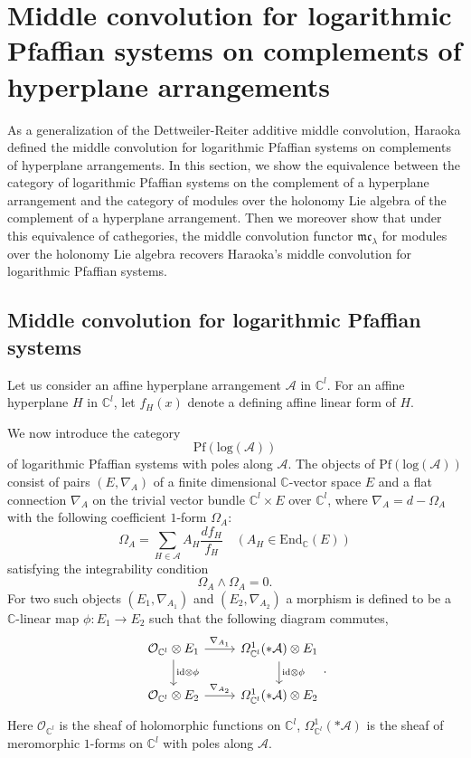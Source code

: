 \documentclass[a4paper,12pt]{article}
\newcommand{\C}{\mathbb{C}}
\theoremstyle{definition}
\theoremstyle{remark}
\begin{document}
\section{Middle convolution for logarithmic Pfaffian systems on complements of hyperplane arrangements}\label{sec:mcPf}
As a generalization of the Dettweiler-Reiter additive middle convolution,
Haraoka \cite{Har1} defined the middle convolution for logarithmic Pfaffian systems on complements of hyperplane arrangements.
In this section, we show the equivalence
between the category of logarithmic Pfaffian systems on the complement of a hyperplane arrangement 
and the category of modules over the holonomy Lie algebra of the complement of a hyperplane arrangement.
Then we moreover show that under this equivalence of cathegories,
the middle convolution functor $\mathfrak{mc}_{\lambda}$ for modules over the holonomy Lie algebra
recovers Haraoka's middle convolution for logarithmic Pfaffian systems.
\subsection{Middle convolution for logarithmic Pfaffian systems}\label{sec:logPf}
Let us consider an affine hyperplane arrangement $\mathcal{A}$ in $\C^{l}$.
For an affine hyperplane $H$ in $\mathbb{C}^{l}$, let $f_{H}(x)$ denote a defining affine linear form of $H$.

We now introduce the category 
\[
	\mathrm{Pf}(\mathrm{log}(\mathcal{A}))
\]
of logarithmic Pfaffian systems with poles along $\mathcal{A}$. 
The objects of $\mathrm{Pf}(\mathrm{log}(\mathcal{A}))$ 
consist of 
pairs $(E,\nabla_{A})$
of a finite dimensional $\mathbb{C}$-vector space $E$ and a flat connection $\nabla_{A}$ on the trivial vector bundle $\mathbb{C}^{l}\times E$ over $\mathbb{C}^{l}$, 
where $\nabla_{A}=d-\Omega_{A}$
with the following coefficient $1$-form $\Omega_{A}$: 
\[
	\Omega_{A}=\sum_{H\in \mathcal{A}}A_{H}\frac{df_{H}}{f_{H}}\quad (A_{H}\in \mathrm{End}_{\mathbb{C}}(E))
\]
satisfying the integrability condition
\[	
	\Omega_{A}\wedge \Omega_{A}=0.
\]
For two such objects $(E_1, \nabla_{A_1})$ and $(E_2, \nabla_{A_2})$
a morphism 
is defined to be a $\mathbb{C}$-linear map $\phi\colon E_{1}\rightarrow E_{2}$
such that the following diagram commutes,
\[
\begin{tikzcd}
\mathcal{O}_{\mathbb{C}^{l}}\otimes E_{1}\arrow[r,"\nabla_{A_{1}}"]\arrow[d,"\mathrm{id}\otimes \phi"]&
\varOmega_{\mathbb{C}^{l}}^{1}(*\mathcal{A})\otimes E_{1}\arrow[d,"\mathrm{id}\otimes \phi"]\\
\mathcal{O}_{\mathbb{C}^{l}}\otimes E_{2}\arrow[r,"\nabla_{A_{2}}"]&
\varOmega_{\mathbb{C}^{l}}^{1}(*\mathcal{A})\otimes E_{2}
\end{tikzcd}.
\]
Here $\mathcal{O}_{\mathbb{C}^{l}}$ is the sheaf of holomorphic functions on $\mathbb{C}^{l}$, $\varOmega_{\mathbb{C}^{l}}^{1}(*\mathcal{A})$ is the sheaf of meromorphic $1$-forms on $\mathbb{C}^{l}$ with poles along $\mathcal{A}$.
\end{document}
